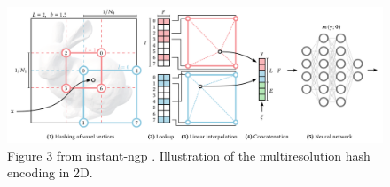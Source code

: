 \begin{figure}[h]
    \centering
    \includegraphics[width=1.0\textwidth]{figures/instant-ngp-hash-encoding.png}
    \caption[Illustration of multiresolution hash encoding]{Figure 3 from instant-ngp \cite{muller_instant_2022}. Illustration of the multiresolution hash encoding in 2D.}
    \label{fig:instant-ngp-hash-encoding}
\end{figure}